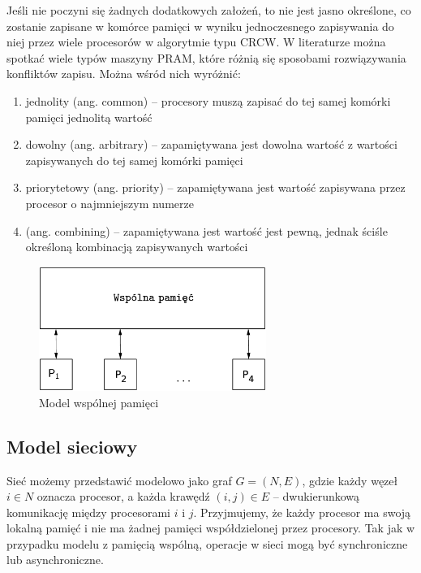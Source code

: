 \documentclass[a4paper,oneside,leqno,12pt]{book}
\theoremstyle{definition}
\theoremstyle{plain}
\theoremstyle{remark}
\begin{document}
Jeśli nie poczyni się żadnych dodatkowych założeń, to nie jest jasno określone, co zostanie zapisane w komórce pamięci w wyniku jednoczesnego zapisywania do niej przez wiele procesorów w algorytmie typu CRCW. W literaturze można spotkać wiele typów maszyny PRAM, które różnią się sposobami rozwiązywania konfliktów zapisu. Można wśród nich wyróżnić\cite{Cormen94}:

\begin{enumerate}
\item jednolity (ang. common) – procesory muszą zapisać do tej samej komórki pamięci jednolitą wartość
\item dowolny (ang. arbitrary) – zapamiętywana jest dowolna wartość z wartości zapisywanych do tej samej komórki pamięci
\item priorytetowy (ang. priority) – zapamiętywana jest wartość zapisywana przez procesor o najmniejszym numerze
\item (ang. combining) – zapamiętywana jest wartość jest pewną, jednak ściśle określoną kombinacją zapisywanych wartości
\end{enumerate}

\begin{figure}[h]
\centering
\includegraphics[width=20em]{./images/Rys4.eps}
\caption{Model wspólnej pamięci}
\label{fig:model_shared}
\end{figure}

\subsection{Model sieciowy}

Sieć możemy przedstawić modelowo jako graf \(G=(N,E)\), gdzie każdy węzeł \(i\in N\) oznacza procesor, a każda krawędź \((i, j) \in E\) – dwukierunkową komunikację między procesorami \(i\) i \(j\). Przyjmujemy, że każdy procesor ma swoją lokalną pamięć i nie ma żadnej pamięci współdzielonej przez procesory. Tak jak w przypadku modelu z pamięcią wspólną, operacje w sieci mogą być synchroniczne lub asynchroniczne.\\
\end{document}
